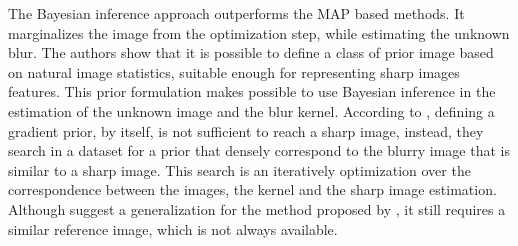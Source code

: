 \documentclass[conference,compsoc]{IEEEtran}
\begin{document}
The Bayesian inference approach \cite{Levin} outperforms the MAP based methods. It marginalizes
the image from the optimization step, while estimating the unknown blur.
The authors show that it is possible to define a class of prior image
based on natural image statistics, suitable enough for representing sharp images features.
This prior formulation makes possible to use Bayesian inference in the estimation of the
unknown image and the blur kernel. According to \cite{Hacohen13}, defining a gradient
prior, by itself, is not sufficient to reach a sharp image, instead,
they search in a dataset for a prior that densely correspond to
the blurry image that is similar to a sharp image. This search is an
iteratively optimization over the correspondence between the images, the kernel and
the sharp image estimation. Although \cite{Pan2014} suggest a generalization
for the method proposed by \cite{Hacohen13}, it still requires a similar reference image,
which is not always available.
\end{document}
